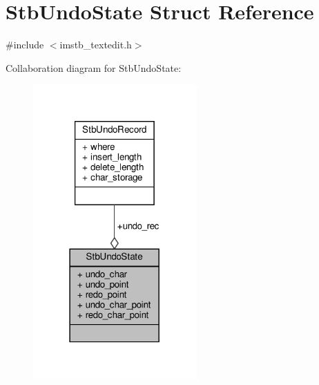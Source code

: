\hypertarget{structStbUndoState}{}\section{Stb\+Undo\+State Struct Reference}
\label{structStbUndoState}


{\ttfamily \#include $<$imstb\+\_\+textedit.\+h$>$}



Collaboration diagram for Stb\+Undo\+State\+:
\nopagebreak
\begin{figure}[H]
\begin{center}
\leavevmode
\includegraphics[width=178pt]{structStbUndoState__coll__graph}
\end{center}
\end{figure}
